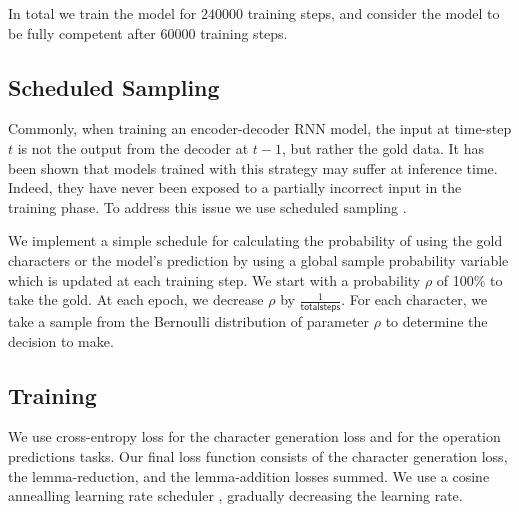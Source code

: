 \documentclass[11pt,a4paper]{article}
\newcommand\jp[1]{\textbf{JP: #1}}
\begin{document}
In total we train the model for $240 000$ training steps, and consider
the model to be fully competent after $60 000$ training steps.






\subsection{Scheduled Sampling}

Commonly, when training an encoder-decoder RNN model, the input at
time-step $t$ is not the output from the decoder at $t-1$, but rather
the gold data.  It has been shown that models trained with this
strategy may suffer at inference time. Indeed, they have never been
exposed to a partially incorrect input in the training phase.  To
address this issue we use scheduled sampling
\cite{DBLP:conf/nips/BengioVJS15}.

We implement a simple schedule for calculating the probability of
using the gold characters or the model's prediction by using a global
sample probability variable which is updated at each training step. We
start with a probability \(\rho\) of 100\% to take the gold. At each
epoch, we decrease \(\rho\) by $\frac{1}{\mathsf{total steps}}$. For each
character, we take a sample from the Bernoulli distribution of
parameter \(\rho\) to determine the decision to make.

\subsection{Training}

We use cross-entropy loss for the character generation loss and 
for the operation predictions tasks. Our final loss function consists
of the character generation loss, the lemma-reduction, and the
lemma-addition losses summed. We use a cosine annealling learning rate
scheduler \cite{DBLP:conf/iclr/LoshchilovH17}, gradually decreasing
the learning rate.
\end{document}
